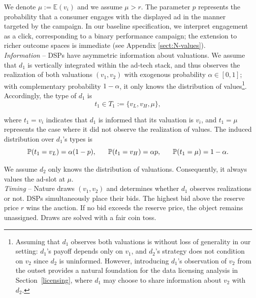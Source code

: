 \documentclass[11pt]{article}
\theoremstyle{plain}
\theoremstyle{definition}
\theoremstyle{plain}
\theoremstyle{plain}
\theoremstyle{plain}
\theoremstyle{plain}
\numberwithin{equation}{section}
\begin{document}
\vspace{0.2cm}

\noindent We denote $ \mu := \mathbb{E}(v_i) $ and we assume $ \mu > r$. The parameter $ p $ represents the probability that a consumer engages with the displayed ad in the manner targeted by the campaign. In our baseline specification, we interpret engagement as a click, corresponding to a binary performance campaign; the extension to richer outcome spaces is immediate (see Appendix \ref{sect:N-values}). \\

\noindent \textit{Information} -- DSPs have asymmetric information about valuations. We assume that $ d_1 $ is vertically integrated within the ad-tech stack, and thus observes the realization of both valuations $ (v_1, v_2) $ with exogenous probability $ \alpha \in [0,1] $; with complementary probability $ 1 - \alpha $, it only knows the distribution of values\footnote{Assuming that $ d_1 $ observes both valuations is without loss of generality in our setting: $ d_1 $'s payoff depends only on $ v_1 $, and $ d_2 $'s strategy does not condition on $ v_2 $ since $ d_2 $ is uninformed. However, introducing $ d_1 $'s observation of $ v_2 $ from the outset provides a natural foundation for the data licensing analysis in Section~\ref{licensing}, where $ d_1 $ may choose to share information about $ v_2 $ with $ d_2 $.}. Accordingly, the type of $ d_1 $ is
\begin{equation*}
 t_1 \in T_1 := \{ v_L, v_H, \mu \},    
\end{equation*}
 
\noindent where $ t_1 = v_i $ indicates that $ d_1 $ is informed that its valuation is $ v_i $, and $ t_1 = \mu $ represents the case where it did not observe the realization of values. The induced distribution over $ d_1 $'s types is
\begin{equation*}
\mathbb{P}(t_1 = v_L) = \alpha(1 - p), \hspace{0.6cm} 
\mathbb{P}(t_1 = v_H) = \alpha p, \hspace{0.6cm}
\mathbb{P}(t_1 = \mu) = 1 - \alpha.
\end{equation*}

\noindent We assume $ d_2 $ only knows the distribution of valuations. Consequently, it always values the ad-slot at $ \mu $. \\

\noindent \textit{Timing} -- Nature draws $ (v_1, v_2) $ and determines whether $ d_1 $ observes realizations or not. DSPs simultaneously place their bids. The highest bid above the reserve price $ r $ wins the auction. If no bid exceeds the reserve price, the object remains unassigned. Draws are solved with a fair coin toss. \\
\end{document}

